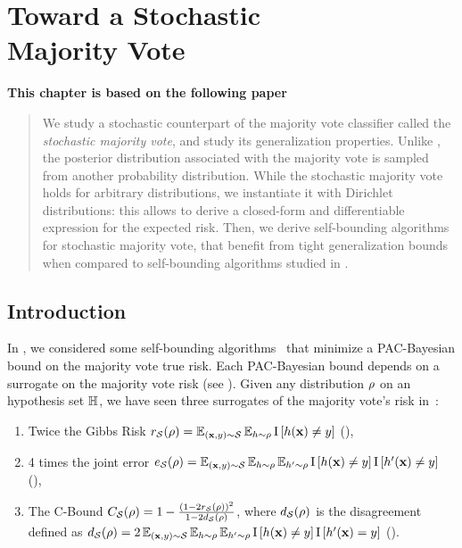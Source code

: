 \chapter[Toward a Stochastic Majority Vote]{Toward a Stochastic\\ Majority Vote}
\label{chap:mv-sto}

\addchapterlof
\addchapterloa
\addchapterloe

\vspace{-1.0cm}
\begin{center}
\textbf{This chapter is based on the following paper}\\[0.1cm]
\end{center}

\vspace{0.2cm}
\minitoc

\begin{abstract}
We study a stochastic counterpart of the majority vote classifier called the {\it stochastic majority vote}, and study its generalization properties.
Unlike , the posterior distribution associated with the majority vote is sampled from another probability distribution.
While the stochastic majority vote holds for arbitrary distributions, we instantiate it with Dirichlet distributions: this allows to derive a closed-form and differentiable expression for the expected risk.
Then, we derive self-bounding algorithms for stochastic majority vote, that benefit from tight generalization bounds when compared to self-bounding algorithms studied in .
\end{abstract}

\newpage

\section{Introduction}

In , we considered some self-bounding algorithms~\citep{Freund1998} that minimize a PAC-Bayesian bound on the majority vote true risk.
Each PAC-Bayesian bound depends on a surrogate on the majority vote risk (see ).
Given any distribution $\rho$ on an hypothesis set $\mathbb{H}$, we have seen three surrogates of the majority vote's risk in~:
\begin{enumerate}[label={\it (\roman*)}]
    \item Twice the Gibbs Risk $r_{\mathcal{S}}(\rho)=\operatorname*{\mathbb{E}}_{(\mathbf{x},y)\sim\mathcal{S}}   \operatorname*{\mathbb{E}}_{h\sim \rho} \operatorname{I}\left[h(\mathbf{x}) \ne y\right]$ (),
    \item 4 times the joint error $e_{\mathcal{S}}(\rho)=\operatorname*{\mathbb{E}}_{(\mathbf{x},y)\sim\mathcal{S}} \operatorname*{\mathbb{E}}_{h\sim\rho}\operatorname*{\mathbb{E}}_{h'\sim\rho}
     \operatorname{I}\left[h(\mathbf{x}) \ne y\right]\operatorname{I}\left[h'(\mathbf{x}) \ne y\right]$ (),
    \item The C-Bound ${C}_{\mathcal{S}}(\rho) = 1-\frac{\left(1-2r_{\mathcal{S}}(\rho)\right)^2}{1-2d_{\mathcal{S}}(\rho)}$, where $d_{\mathcal{S}}(\rho)$ is the disagreement defined as $d_{\mathcal{S}}(\rho)=2\operatorname*{\mathbb{E}}_{(\mathbf{x},y)\sim\mathcal{S}}\operatorname*{\mathbb{E}}_{h\sim\rho}\operatorname*{\mathbb{E}}_{h'\sim\rho}\operatorname{I}\left[ h(\mathbf{x})\ne y\right]\operatorname{I}\left[ h'(\mathbf{x})=y\right]$ ().
\end{enumerate}

